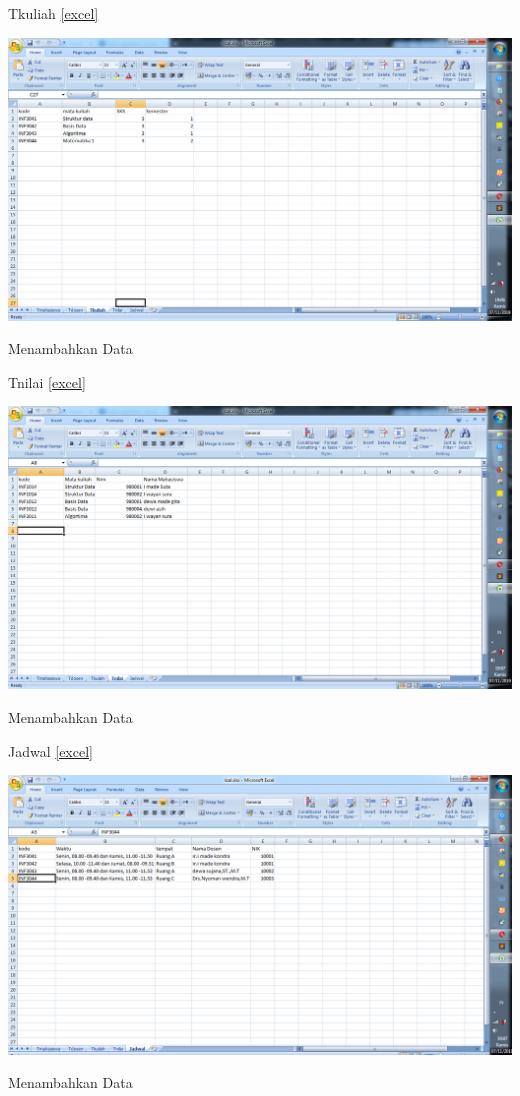 \documentclass{article}
\begin{document}
\begin{enumerate}
        Tkuliah
    \ref{excel}
    \begin{center}
         \centering
            \includegraphics[scale=0.27]{gambar/3.PNG}
        \caption{Menambahkan Data}
        \label{excel}
    \end{center}
    
        Tnilai
    \ref{excel}
    \begin{center}
         \centering
            \includegraphics[scale=0.27]{gambar/4.PNG}
        \caption{Menambahkan Data}
        \label{excel}
    \end{center}
    
        Jadwal
    \ref{excel}
    \begin{center}
         \centering
            \includegraphics[scale=0.27]{gambar/5.png}
        \caption{Menambahkan Data}
        \label{excel}
    \end{center}
       

\end{enumerate}
\end{document}
